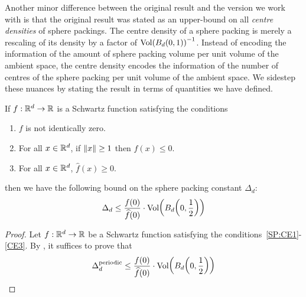 Another minor difference between the original result and the version we work with is that the original result was stated as an upper-bound on all \textit{centre densities} of sphere packings. The centre density of a sphere packing is merely a rescaling of its density by a factor of $\operatorname{Vol}\!\left( B_d\!\left( 0, 1 \right) \right)^{-1}$. Instead of encoding the information of the amount of sphere packing volume per unit volume of the ambient space, the centre density encodes the information of the number of centres of the sphere packing per unit volume of the ambient space. We sidestep these nuances by stating the result in terms of quantities we have defined.

\begin{boxtheorem}\label{SP:Thm:CohnElkies} %
    If $f : \mathbb{R}^d \to \mathbb{R}$ is a Schwartz function satisfying the conditions
    \begin{enumerate}[label = \normalfont(CE\arabic*)]
        \item\label{SP:CE1} $f$ is not identically zero.
        \item\label{SP:CE2} For all $x \in \mathbb{R}^d$, if $\left\lVert x \right\rVert \geq 1$ then $f(x) \leq 0$.
        \item\label{SP:CE3} For all $x \in \mathbb{R}^d$, $\hat{f}(x) \geq 0$.
    \end{enumerate}
    then we have the following bound on the sphere packing constant $\Delta_d$:
    \begin{align*}
        \Delta_d \leq \frac{f(0)}{\widehat{f}(0)} \cdot \operatorname{Vol}\!\left( B_d\!\left( 0, \frac{1}{2} \right) \right)
    \end{align*}
\end{boxtheorem}
\begin{proof}
    Let $f : \mathbb{R}^d \to \mathbb{R}$ be a Schwartz function satisfying the conditions~\ref{SP:CE1}-\ref{CE3}. By , it suffices to prove that
    \begin{align*}
        \Delta_d^{\text{periodic}} \leq \frac{f(0)}{\widehat{f}(0)} \cdot \operatorname{Vol}\!\left( B_d\!\left( 0, \frac{1}{2} \right) \right)
    \end{align*}

\end{proof}